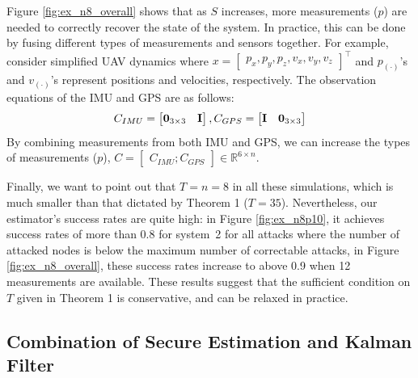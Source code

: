 \documentclass[../../thesis.tex]{subfiles}
\begin{document}
Figure \ref{fig:ex_n8_overall} shows that as $S$ increases, more measurements ($p$) are needed to correctly recover the state of the system. In practice, this can be done by fusing different types of measurements and sensors together. For example, consider simplified UAV dynamics where $ x = \begin{bmatrix} p_x, p_y, p_z, v_x, v_y, v_z \end{bmatrix}^\top$ and $p_{(\cdot)}$'s and $v_{(\cdot)}$'s represent positions and velocities, respectively. The observation equations of the IMU and GPS are as follows:
\begin{equation}
C_{IMU} =\begin{bmatrix} {\bf 0}_{3\times 3} & {\bf I} \end{bmatrix}, C_{GPS} = \begin{bmatrix} {\bf I} & {\bf 0}_{3\times 3} \end{bmatrix} \nonumber
\end{equation}
By combining measurements from both IMU and GPS, we can increase the types of measurements ($p$), $C = \begin{bmatrix} C_{IMU} ; C_{GPS}\end{bmatrix} \in \mathbb{R}^{6 \times n}$.

Finally, we want to point out that $T=n=8$ in all these simulations, which is much smaller than that dictated by Theorem 1 ($T=35$).
Nevertheless, our estimator's success rates are quite high: in Figure \ref{fig:ex_n8p10}, it achieves success rates of more than 0.8 for system~2 for all attacks where the number of attacked nodes is below the maximum number of correctable attacks, in Figure \ref{fig:ex_n8_overall}, these success rates increase to above 0.9 when 12 measurements are available. These results suggest that the sufficient condition on $T$ given in Theorem 1 is conservative, and can be relaxed in practice.

\subsection{Combination of Secure Estimation and Kalman Filter}\label{sec:estimation}
\end{document}
